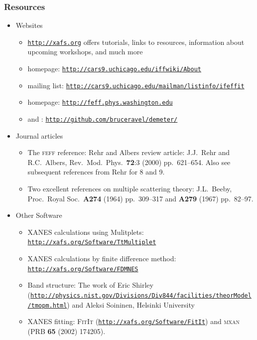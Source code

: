 \documentclass[10pt, xcolor=x11names, compress]{beamer}
\begin{document}
\begin{frame}
  \frametitle{Resources}
  \begin{itemize}
  \item Websites
    \begin{itemize}
    \item \scriptsize
      \href{http://xafs.org}{\color{Blue4}\texttt{http://xafs.org}}
      offers tutorials, links to resources, information about upcoming
      workshops, and much more
    \item \scriptsize {\ifeffit} homepage:
      \href{http://cars9.uchicago.edu/iffwiki/About}
      {\color{Blue4}\texttt{http://cars9.uchicago.edu/iffwiki/About}}
    \item \scriptsize {\ifeffit} mailing list:
      \href{http://cars9.uchicago.edu/mailman/listinfo/ifeffit}
      {\color{Blue4}\texttt{http://cars9.uchicago.edu/mailman/listinfo/ifeffit}}
    \item \scriptsize {\feff} homepage:
      \href{http://feff.phys.washington.edu}
      {\color{Blue4}\texttt{http://feff.phys.washington.edu}}
    \item \scriptsize {\athena} and {\artemis}:
      \href{http://github.com/bruceravel/demeter}
      {\color{Blue4}\texttt{http://github.com/bruceravel/demeter/}}
    \end{itemize}
  \item Journal articles
    \begin{itemize}
    \item \scriptsize The \textsc{feff} reference: Rehr and Albers
      review article: J.J.~Rehr and R.C.~Albers, Rev.\ Mod.\ Phys.\
      \textbf{72}:3 (2000) pp.\ 621--654.  Also see subsequent
      references from Rehr for {\feff}8 and {\feff}9.
    \item \scriptsize Two excellent references on multiple scattering theory:
      J.L.~Beeby, Proc.\ Royal Soc.\ \textbf{A274} (1964) pp.\
      309--317 and \textbf{A279} (1967) pp.\ 82--97.
    \end{itemize}
  \item Other Software
    \begin{itemize}
    \item \scriptsize XANES calculations using Mulitplets:
      \href{http://xafs.org/Software/TtMultiplet}
      {\color{Blue4}\texttt{http://xafs.org/Software/TtMultiplet}}
    \item \scriptsize XANES calculations by finite difference method:
      \href{http://xafs.org/Software/FDMNES}
      {\color{Blue4}\texttt{http://xafs.org/Software/FDMNES}}
    \item \scriptsize Band structure: The work of Eric Shirley
      (\href{http://physics.nist.gov/Divisions/Div844/facilities/theorModel/tmopm.html}
      {\color{Blue4}\tiny \texttt{http://physics.nist.gov/Divisions/Div844/facilities/theorModel/tmopm.html}}) and
      Aleksi Soininen, Helsinki University
    \item \scriptsize XANES fitting: \textsc{FitIt} (\href{http://xafs.org/Software/FitIt}{\color{Blue4}\texttt{http://xafs.org/Software/FitIt}})
      and \textsc{mxan} (PRB \textbf{65} (2002) 174205).
    \end{itemize}
  \end{itemize}
\end{frame}
\end{document}

